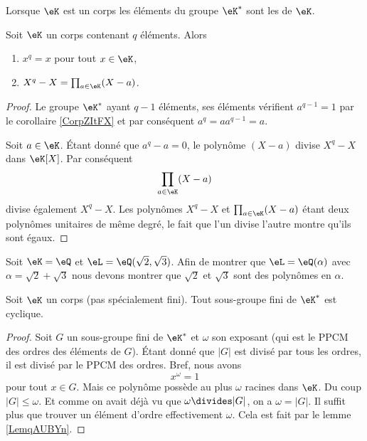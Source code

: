 Lorsque \( \eK\) est un corps les éléments du groupe \( \eK^*\) sont les  de \( \eK\).
\begin{proposition}     \label{propQRcUlq}
    Soit \( \eK\) un corps contenant \( q\) éléments. Alors
    \begin{enumerate}
        \item
            \( x^q=x\) pour tout \( x\in \eK\),
        \item
            \( X^q-X=\prod_{a\in \eK}(X-a)\).
    \end{enumerate}
\end{proposition}

\begin{proof}
    Le groupe \( \eK^*\) ayant \( q-1\) éléments, ses éléments vérifient \( a^{q-1}=1\) par le corollaire \ref{CorpZItFX} et par conséquent \( a^q=aa^{q-1}=a \).

    Soit \( a\in \eK\). Étant donné que \( a^q-a=0\), le polynôme \( (X-a)\) divise \( X^q-X\) dans \( \eK[X]\). Par conséquent 
    \begin{equation}
        \prod_{a\in \eK}(X-a)
    \end{equation}
    divise également \( X^q-X\). Les polynômes \( X^q-X\) et \( \prod_{a\in \eK}(X-a)\) étant deux polynômes unitaires de même degré, le fait que l'un divise l'autre montre qu'ils sont égaux.
\end{proof}

\begin{example}
    Soit \( \eK=\eQ\) et \( \eL=\eQ(\sqrt{2},\sqrt{3})\). Afin de montrer que \( \eL=\eQ(\alpha)\) avec \( \alpha=\sqrt{2}+\sqrt{3}\) nous devons montrer que \( \sqrt{2}\) et \( \sqrt{3}\) sont des polynômes en \( \alpha\).
\end{example}

\begin{theorem}      \label{ThobkwCMm}
    Soit \( \eK\) un corps (pas spécialement fini). Tout sous-groupe fini de \( \eK^*\) est cyclique.
\end{theorem}

\begin{proof}
    Soit \( G\) un sous-groupe fini de \( \eK^*\) et \( \omega\) son exposant (qui est le PPCM des ordres des éléments de \( G\)). Étant donné que \( | G |\) est divisé par tous les ordres, il est divisé par le PPCM des ordres. Bref, nous avons
    \begin{equation}
        x^{\omega}=1
    \end{equation}
    pour tout \( x\in G\). Mais ce polynôme possède au plus \( \omega\) racines dans \( \eK\). Du coup \( | G |\leq \omega\). Et comme on avait déjà vu que \( \omega\divides | G |\), on a \( \omega=| G |\). Il suffit plus que trouver un élément d'ordre effectivement \( \omega\). Cela est fait par le lemme \ref{LemqAUBYn}.
\end{proof}

